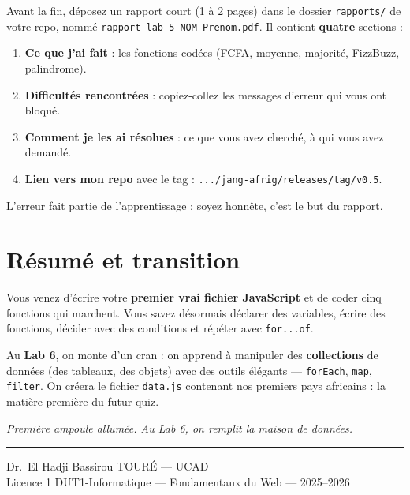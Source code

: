 \documentclass[11pt,a4paper]{article}
\newcommand{\code}[1]{\texttt{#1}}
\begin{document}
\begin{attentionbox}
Avant la fin, déposez un rapport court (1 à 2 pages) dans le dossier \code{rapports/} de votre repo, nommé \code{rapport-lab-5-NOM-Prenom.pdf}. Il contient \textbf{quatre} sections :
\begin{enumerate}[leftmargin=*,noitemsep]
  \item \textbf{Ce que j'ai fait} : les fonctions codées (FCFA, moyenne, majorité, FizzBuzz, palindrome).
  \item \textbf{Difficultés rencontrées} : copiez-collez les messages d'erreur qui vous ont bloqué.
  \item \textbf{Comment je les ai résolues} : ce que vous avez cherché, à qui vous avez demandé.
  \item \textbf{Lien vers mon repo} avec le tag : \code{.../jang-afrig/releases/tag/v0.5}.
\end{enumerate}
L'erreur fait partie de l'apprentissage : soyez honnête, c'est le but du rapport.
\end{attentionbox}

\section{Résumé et transition}

Vous venez d'écrire votre \textbf{premier vrai fichier JavaScript} et de coder cinq fonctions qui marchent. Vous savez désormais déclarer des variables, écrire des fonctions, décider avec des conditions et répéter avec \code{for...of}.

Au \textbf{Lab 6}, on monte d'un cran : on apprend à manipuler des \textbf{collections} de données (des tableaux, des objets) avec des outils élégants --- \code{forEach}, \code{map}, \code{filter}. On créera le fichier \code{data.js} contenant nos premiers pays africains : la matière première du futur quiz.

\begin{center}
\textit{Première ampoule allumée. Au Lab 6, on remplit la maison de données.}
\end{center}

\bigskip
\noindent\rule{\textwidth}{0.4pt}
\begin{center}
\small Dr.~El Hadji Bassirou TOURÉ --- UCAD\\
\small Licence 1 DUT1-Informatique --- Fondamentaux du Web --- 2025--2026
\end{center}
\end{document}

